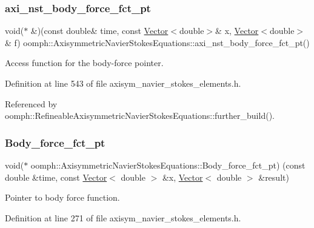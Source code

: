 \subsubsection{\texorpdfstring{axi\+\_\+nst\+\_\+body\+\_\+force\+\_\+fct\+\_\+pt}{axi\_nst\_body\_force\_fct\_pt}}
{\footnotesize\ttfamily void($\ast$ \&)(const double\& time, const \hyperlink{classoomph_1_1Vector}{Vector}$<$double$>$\& x, \hyperlink{classoomph_1_1Vector}{Vector}$<$double$>$ \& f) oomph\+::\+Axisymmetric\+Navier\+Stokes\+Equations\+::axi\+\_\+nst\+\_\+body\+\_\+force\+\_\+fct\+\_\+pt()\hspace{0.3cm}{\ttfamily [inline]}}



Access function for the body-\/force pointer. 



Definition at line 543 of file axisym\+\_\+navier\+\_\+stokes\+\_\+elements.\+h.



Referenced by oomph\+::\+Refineable\+Axisymmetric\+Navier\+Stokes\+Equations\+::further\+\_\+build().

\mbox{\label{classoomph_1_1AxisymmetricNavierStokesEquations_a83815184422697e10d9ebe3b13640704}} 
\subsubsection{\texorpdfstring{Body\+\_\+force\+\_\+fct\+\_\+pt}{Body\_force\_fct\_pt}}
{\footnotesize\ttfamily void($\ast$ oomph\+::\+Axisymmetric\+Navier\+Stokes\+Equations\+::\+Body\+\_\+force\+\_\+fct\+\_\+pt) (const double \&time, const \hyperlink{classoomph_1_1Vector}{Vector}$<$ double $>$ \&x, \hyperlink{classoomph_1_1Vector}{Vector}$<$ double $>$ \&result)\hspace{0.3cm}{\ttfamily [protected]}}



Pointer to body force function. 



Definition at line 271 of file axisym\+\_\+navier\+\_\+stokes\+\_\+elements.\+h.



